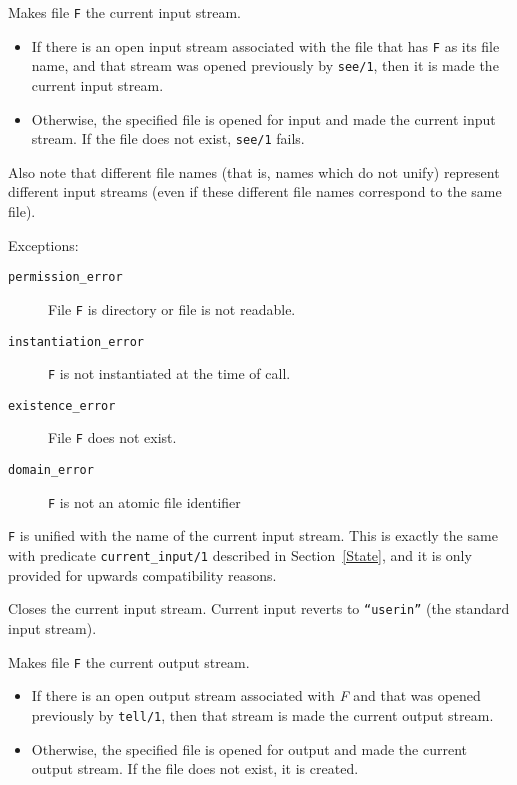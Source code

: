 \begin{description}
    Makes file {\tt F} the current input stream. 
    \begin{itemize}
    \item If there is an open input stream associated with the file that 
          has {\tt F} as its file name, and that stream was opened previously
	  by {\tt see/1}, then it is made the current input stream.
    \item Otherwise, the specified file is opened for input and made the
          current input stream. If the file does not exist, {\tt see/1} 
	  fails.
    \end{itemize}
    Also note that different file names (that is, names which do not unify) 
    represent different input streams (even if these different file names 
    correspond to the same file).

    Exceptions:
    \begin{description}
    \item[{\tt permission\_error}]
    	File {\tt F} is directory or file is not readable. 
    \item[{\tt instantiation\_error}]
    	{\tt F} is not instantiated at the time of call. 
    \item[{\tt existence\_error}]
    	File {\tt F} does not exist. 
    \item[{\tt domain\_error}]
    	{\tt F} is not an atomic file identifier
    \end{description}

    {\tt F} is unified with the name of the current input stream.
    This is exactly the same with predicate {\tt current\_input/1}
    described in Section~\ref{State}, and it is only provided for
    upwards compatibility reasons.

    Closes the current input stream. 
    Current input reverts to {\tt ``userin''} (the standard input stream).

    Makes file {\tt F} the current output stream. 
    \begin{itemize}
    \item If there is an open output stream associated with {\em F}  
          and that was opened previously 
          by {\tt tell/1}, then that stream is made the current output 
	  stream. 
    \item Otherwise, the specified file is opened for output and made the
          current output stream. If the file does not exist, it is created.
    \end{itemize}


\end{description}
